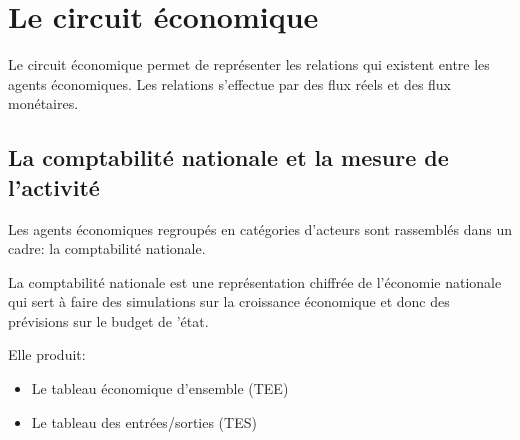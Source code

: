 	\section{Le circuit économique}
	Le circuit économique permet de représenter les relations qui existent entre les agents économiques. Les relations s'effectue par des flux réels et
	des flux monétaires.

	\subsection{La comptabilité nationale et la mesure de l'activité}
	Les agents économiques regroupés en catégories d'acteurs sont rassemblés dans un cadre: la comptabilité nationale.

	La comptabilité nationale est une représentation chiffrée de l'économie nationale qui sert à faire des simulations sur la croissance économique et
	donc des prévisions sur le budget de 'état.

	Elle produit: 
	\begin{itemize}
		\item Le tableau économique d'ensemble (TEE)
		\item Le tableau des entrées/sorties (TES)
	\end{itemize}
